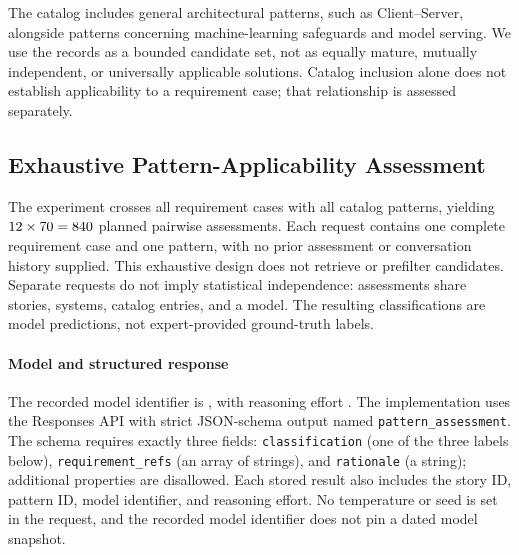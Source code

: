 The catalog includes general architectural patterns, such as Client--Server,
alongside patterns concerning machine-learning safeguards and model serving.
We use the records as a bounded candidate set, not as equally mature,
mutually independent, or universally applicable solutions. Catalog inclusion
alone does not establish applicability to a requirement case; that relationship
is assessed separately.


\subsection{Exhaustive Pattern-Applicability Assessment}
\label{sec:applicability-experiment}

The experiment crosses all \StudyStoryCount{} requirement cases with all
\StudyPatternCount{} catalog patterns, yielding
$12 \times 70 = 840$ planned
pairwise assessments. Each request contains one complete requirement case and
one pattern, with no prior assessment or conversation history supplied. This
exhaustive design does not retrieve or prefilter candidates. Separate requests
do not imply statistical independence: assessments share stories, systems,
catalog entries, and a model. The resulting classifications are model
predictions, not expert-provided ground-truth labels.

\paragraph{Model and structured response}
The recorded model identifier is \texttt{\ApplicabilityModel}, with reasoning
effort \texttt{\ApplicabilityReasoningEffort}. The implementation uses the
Responses API with strict JSON-schema output named
\texttt{pattern\_assessment}. The schema requires exactly three fields:
\texttt{classification} (one of the three labels below),
\texttt{requirement\_refs} (an array of strings), and \texttt{rationale}
(a string); additional properties are disallowed. Each stored result also
includes the story ID, pattern ID, model identifier, and reasoning effort.
No temperature or seed is set in the request, and the recorded model identifier
does not pin a dated model snapshot.

